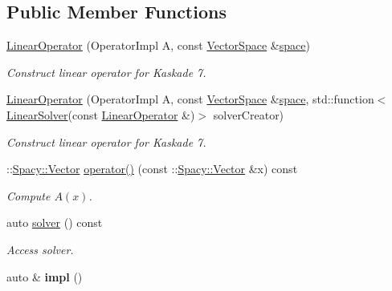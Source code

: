 \subsection*{Public Member Functions}
\begin{DoxyCompactItemize}
\item 
\hyperlink{classSpacy_1_1Kaskade_1_1LinearOperator_a24acb8f5c16194484d4afe5777a5aea5_a24acb8f5c16194484d4afe5777a5aea5}{Linear\+Operator} (Operator\+Impl A, const \hyperlink{classSpacy_1_1VectorSpace}{Vector\+Space} \&\hyperlink{classSpacy_1_1VectorBase_a95e87ce98f5a7646055d4e87e6024044_a95e87ce98f5a7646055d4e87e6024044}{space})
\begin{DoxyCompactList}\small\item\em Construct linear operator for Kaskade 7. \end{DoxyCompactList}\item 
\hyperlink{classSpacy_1_1Kaskade_1_1LinearOperator_a5c287f9cae480a07428e49af70875b7a_a5c287f9cae480a07428e49af70875b7a}{Linear\+Operator} (Operator\+Impl A, const \hyperlink{classSpacy_1_1VectorSpace}{Vector\+Space} \&\hyperlink{classSpacy_1_1VectorBase_a95e87ce98f5a7646055d4e87e6024044_a95e87ce98f5a7646055d4e87e6024044}{space}, std\+::function$<$ \hyperlink{namespaceSpacy_a7d5cd1c6fb9dd85aa345b536caf30bba_a7d5cd1c6fb9dd85aa345b536caf30bba}{Linear\+Solver}(const \hyperlink{classSpacy_1_1Kaskade_1_1LinearOperator}{Linear\+Operator} \&)$>$ solver\+Creator)
\begin{DoxyCompactList}\small\item\em Construct linear operator for Kaskade 7. \end{DoxyCompactList}\item 
\+::\hyperlink{classSpacy_1_1Vector}{Spacy\+::\+Vector} \hyperlink{classSpacy_1_1Kaskade_1_1LinearOperator_added0f85104ded29f4c87992f5b5a81b_added0f85104ded29f4c87992f5b5a81b}{operator()} (const \+::\hyperlink{classSpacy_1_1Vector}{Spacy\+::\+Vector} \&x) const 
\begin{DoxyCompactList}\small\item\em Compute $A(x)$. \end{DoxyCompactList}\item 
auto \hyperlink{classSpacy_1_1Kaskade_1_1LinearOperator_a843c904f87af508090604adc28488e91_a843c904f87af508090604adc28488e91}{solver} () const 
\begin{DoxyCompactList}\small\item\em Access solver. \end{DoxyCompactList}\item 
\hypertarget{classSpacy_1_1Kaskade_1_1LinearOperator_a9aa83e80a234b20d596bbd426be3cd81}{}auto \& {\bfseries impl} ()\label{classSpacy_1_1Kaskade_1_1LinearOperator_a9aa83e80a234b20d596bbd426be3cd81}


\end{DoxyCompactItemize}
